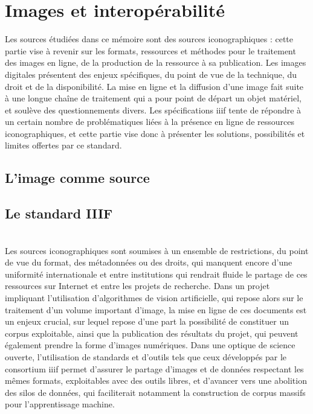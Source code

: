 \documentclass[a4paper,12pt,twoside]{book}
\newcommand{\iiif}{\gls{iiif}\xspace}
\newcommand{\clearemptydoublepage}{\newpage{\pagestyle{empty}\cleardoublepage}}
\begin{document}
        \chapter{Images et interopérabilité}
        Les sources étudiées dans ce mémoire sont des sources iconographiques : cette partie vise à revenir sur les formats, ressources et méthodes pour le traitement des images en ligne, de la production de la ressource à sa publication. Les images digitales présentent des enjeux spécifiques, du point de vue de la technique, du droit et de la disponibilité. La mise en ligne et la diffusion d'une image fait suite à une longue chaîne de traitement qui a pour point de départ un objet matériel, et soulève des questionnements divers. Les spécifications \iiif tente de répondre à un certain nombre de problématiques liées à la présence en ligne de ressources iconographiques, et cette partie vise donc à présenter les solutions, possibilités et limites offertes par ce standard.
        
                \section{L’image comme source}
                    
            
                \section{Le standard IIIF}
                    
        \\
        
        Les sources iconographiques sont soumises à un ensemble de restrictions, du point de vue du format, des métadonnées ou des droits, qui manquent encore d'une uniformité internationale et entre institutions qui rendrait fluide le partage de ces ressources sur Internet et entre les projets de recherche. Dans un projet impliquant l'utilisation d'algorithmes de vision artificielle, qui repose alors sur le traitement d'un volume important d'image, la mise en ligne de ces documents est un enjeux crucial, sur lequel repose d'une part la possibilité de constituer un corpus exploitable, ainsi que la publication des résultats du projet, qui peuvent également prendre la forme d'images numériques. Dans une optique de science ouverte, l'utilisation de standards et d'outils tels que ceux développés par le consortium \iiif permet d'assurer le partage d'images et de données respectant les mêmes formats, exploitables avec des outils libres, et d'avancer vers une abolition des silos de données, qui faciliterait notamment la construction de corpus massifs pour l'apprentissage machine. 
        \clearemptydoublepage
        
\end{document}
